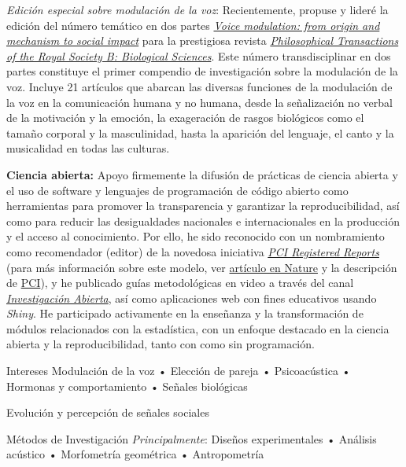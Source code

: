 \documentclass[11pt,a4paper,]{awesome-cv}
\begin{document}
\begin{footnotesize}
\textit{Edición especial sobre modulación de la voz}: Recientemente, propuse y lideré la edición del número temático en dos partes \href{https://royalsocietypublishing.org/toc/rstb/2021/376/1840}{\textit{Voice modulation: from origin and mechanism to social impact}} para la prestigiosa revista \href{https://royalsocietypublishing.org/journal/rstb}{\textit{Philosophical Transactions of the Royal Society B: Biological Sciences}}. Este número transdisciplinar en dos partes constituye el primer compendio de investigación sobre la modulación de la voz. Incluye 21 artículos que abarcan las diversas funciones de la modulación de la voz en la comunicación humana y no humana, desde la señalización no verbal de la motivación y la emoción, la exageración de rasgos biológicos como el tamaño corporal y la masculinidad, hasta la aparición del lenguaje, el canto y la musicalidad en todas las culturas.

\textbf{Ciencia abierta:} Apoyo firmemente la difusión de prácticas de ciencia abierta y el uso de software y lenguajes de programación de código abierto como herramientas para promover la transparencia y garantizar la reproducibilidad, así como para reducir las desigualdades nacionales e internacionales en la producción y el acceso al conocimiento. Por ello, he sido reconocido con un nombramiento como recomendador (editor) de la novedosa iniciativa \href{https://rr.peercommunityin.org/}{\textit{PCI Registered Reports}} (para más información sobre este modelo, ver \href{https://www.nature.com/articles/d41586-023-03342-6}{artículo en Nature} y la descripción de \href{https://rr.peercommunityin.org/about/about}{PCI}), y he publicado guías metodológicas en video a través del canal \href{https://www.youtube.com/@InvestigacionAbierta}{\textit{Investigación Abierta}}, así como aplicaciones web con fines educativos usando \textit{Shiny}. He participado activamente en la enseñanza y la transformación de módulos relacionados con la estadística, con un enfoque destacado en la ciencia abierta y la reproducibilidad, tanto con como sin programación.

\begin{cvskills}
  \cvskill
    {Intereses}
    {Modulación de la voz • Elección de pareja • Psicoacústica • Hormonas y comportamiento • Señales biológicas}
    
  \cvskill
    {}
    {Evolución y percepción de señales sociales}
    
  \cvskill
    {Métodos de Investigación}
    {\textit{Principalmente}: Diseños experimentales • Análisis acústico • Morfometría geométrica • Antropometría}


\end{cvskills}
\end{footnotesize}
\end{document}
